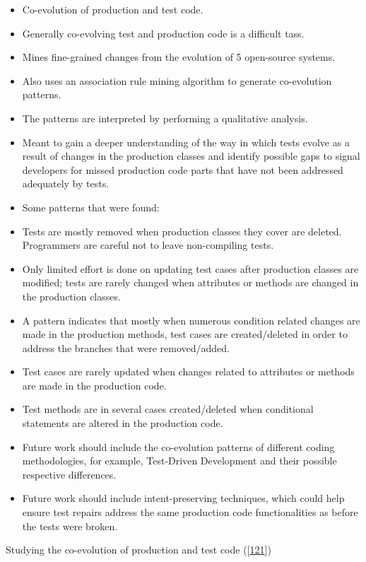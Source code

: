 \documentclass[]{book}
\providecommand{\tightlist}{%
  \setlength{\itemsep}{0pt}\setlength{\parskip}{0pt}}
\begin{document}
\begin{itemize}
\tightlist
\item
  Co-evolution of production and test code.
\item
  Generally co-evolving test and production code is a difficult tass.
\item
  Mines fine-grained changes from the evolution of 5 open-source
  systems.
\item
  Also uses an association rule mining algorithm to generate
  co-evolution patterns.
\item
  The patterns are interpreted by performing a qualitative analysis.
\item
  Meant to gain a deeper understanding of the way in which tests evolve
  as a result of changes in the production classes and identify possible
  gaps to signal developers for missed production code parts that have
  not been addressed adequately by tests.
\item
  Some patterns that were found:
\item
  Tests are mostly removed when production classes they cover are
  deleted. Programmers are careful not to leave non-compiling tests.
\item
  Only limited effort is done on updating test cases after production
  classes are modified; tests are rarely changed when attributes or
  methods are changed in the production classes.
\item
  A pattern indicates that mostly when numerous condition related
  changes are made in the production methods, test cases are
  created/deleted in order to address the branches that were
  removed/added.
\item
  Test cases are rarely updated when changes related to attributes or
  methods are made in the production code.
\item
  Test methods are in several cases created/deleted when conditional
  statements are altered in the production code.
\item
  Future work should include the co-evolution patterns of different
  coding methodologies, for example, Test-Driven Development and their
  possible respective differences.
\item
  Future work should include intent-preserving techniques, which could
  help ensure test repairs address the same production code
  functionalities as before the tests were broken.
\end{itemize}

Studying the co-evolution of production and test code
({[}\protect\hyperlink{ref-zaidman2011studying}{121}{]})
\end{document}

